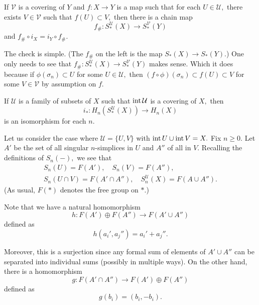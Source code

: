 \documentclass[12pt]{article}
\begin{document}
\begin{prop}
 	If $\mathcal{V}$ is a covering of $Y$ and $f:X\to Y$ is a map such that for each $U \in \mathcal{U},$ there exists $V \in \mathcal{V}$ such that $f(U) \subset V,$ then there is a chain map
 	\begin{equation*} 
 		f_\#:S^{\mathcal{U}}_*(X) \to S^{\mathcal{V}}_*(Y)
 	\end{equation*}
 	and $f_\#\circ i_X = i_Y \circ f_\#.$
\end{prop} 
The check is simple. (The $f_\#$ on the left is the map $S_*(X) \to S_*(Y).$) One only needs to see that $f_\#:S^{\mathcal{U}}_*(X) \to S^{\mathcal{V}}_*(Y)$ makes sense. Which it does because if $\phi(\sigma_n) \subset U$ for some $U \in \mathcal{U},$ then $(f\circ\phi)(\sigma_n) \subset f(U) \subset V$ for some $V \in \mathcal{V}$ by assumption on $f.$

\begin{thm} \label{thm:excision}
	If $\mathcal{U}$ is a family of subsets of $X$ such that $\operatorname{int} \mathcal{U}$ is a covering of $X,$ then
	\begin{equation*} 
		i_*:H_n(S^\mathcal{U}_*(X)) \to H_n(X)
	\end{equation*}
	is an isomorphism for each $n.$
\end{thm}

Let us consider the case where $\mathcal{U} = \{U, V\}$ with $\operatorname{int} U \cup \operatorname{int} V = X.$ Fix $n \ge 0.$ Let $A'$ be the set of all singular $n$-simplices in $U$ and $A''$ of all in $V.$ Recalling the definitions of $S_n(-),$ we see that
\begin{align*} 
	S_n(U) = F(A'), \quad S_n(V) = F(A''),\\
	S_n(U\cap V) = F(A' \cap A''), \quad S^{\mathcal{U}}_n(X) = F(A \cup A'').
\end{align*}
(As usual, $F(*)$ denotes the free group on $*.$)

Note that we have a natural homomorphism
\begin{equation*} 
	h:F(A')\oplus F(A'') \to F(A' \cup A'')
\end{equation*}
defined as
\begin{equation*} 
	h(a_i', a_j'') = a_i' + a_j''.
\end{equation*}

Moreover, this is a surjection since any formal sum of elements of $A' \cup A''$ can be separated into individual sums (possibly in multiple ways). On the other hand, there is a homomorphism
\begin{equation*} 
	g:F(A' \cap A'') \to F(A') \oplus F(A'')
\end{equation*}
defined as
\begin{equation*} 
	g(b_i) = (b_i, -b_i).
\end{equation*}
\end{document}
